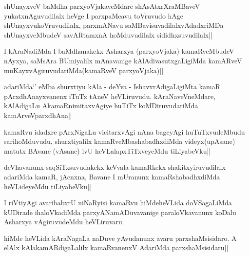 
\begin{artha}
shUnayxveV baMdha parxyoVjakaveMdare shAsAtxrXraMBaveV yukatxnAguvudilalx heVge I parxpaMcavu toVruvudo hAge shUnayxvukoVruvudilalx, parxmANavu saMBavisuvadilalxvAdadxriMDa shUnayxveMbudeV savARtamxnA hoMduvudilalx sididhxsuvudilalx||
\end{artha}


\begin{artha}
I kAraNadiMda I baMdhanakekx Asharxya (parxyoVjaka) kamaRveMbudeV nAyxya, saMsAra BUmiyalilx mAnavanige kAlAdivasutxgaLigiMda kamARveV muKayxvAgiruvudariMda(kamaRveV parxyoVjaka)||
\end{artha}

\begin{artha}
adariMda`\stext' eMba shurxtiyu  kAla - deYva - IshavxrAdigaLigiMta kamaR pArxdhAnayxvanenx iTuTx tAneV heVLiruvudu. kAraNaveVneMdare, kAlAdigaLu AkamaRnimitaxvAgiye huTiTx koMDiruvudariMda kamArveVparxdhAna||
\end{artha}


\begin{artha}
kamaRvu idadxre pArxNigaLu vicitarxvAgi nAna bageyAgi huTuTxvudeMbudu sarihoMduvudu, shurxtiyalilx kamaRveMbashabadhxdiMda videyx(upAsane) matutx BAvane (vAsane) ivU heVLalapxTiTxveyeMdu tiLiyabeVku||
\end{artha}


\begin{artha}
deVhavanunx saqSiTxsuvudakekx keVvala kamaRkekx shakitxyiruvudilalx adariMda kamaR, jAcnxna, Bavane I mUranunx kamaRshabadhxdiMda heVLideyeMdu tiLiyabeVku||
\end{artha}

\begin{artha}
I riVtiyAgi avaribabxrU niNaRyisi kamaRvu hiMdeheVLida doVSagaLiMda kUDirade 
ihaloVkadiMda parxyANamADuvavanige paraloVkavanunx koDalu Asharxya vAgiruvudeMdu 
heVLiruvaru||
\end{artha}

\begin{artha}
hiMde heVLida kAraNagaLa naDuve yAvudanunx avaru parxshaMsisidaro. A elAlx kAlakamARdigaLalilx kamaRvanenxV AdariMda parxshaMsisidaru||
\end{artha}

